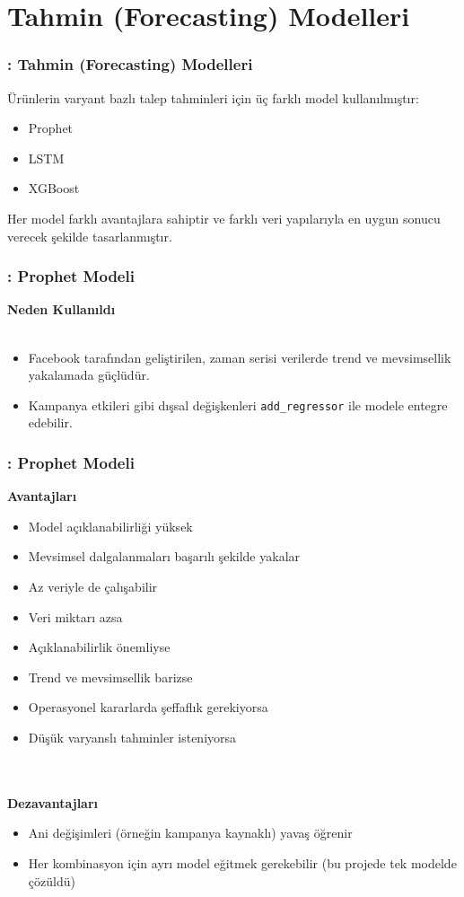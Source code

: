 \documentclass[12pt]{beamer}
\begin{document}
	\section{Tahmin (Forecasting) Modelleri}
	\begin{frame}
		\frametitle{\insertsection: Tahmin (Forecasting) Modelleri}
		Ürünlerin varyant bazlı talep tahminleri için üç farklı model
		kullanılmıştır:
		\vspace{0.5cm}
		\begin{itemize}
			\item Prophet
			\item LSTM
			\item XGBoost
		\end{itemize}
		\vspace{0.5cm}
		Her model farklı avantajlara sahiptir ve farklı veri yapılarıyla en
		uygun sonucu verecek şekilde tasarlanmıştır.
	\end{frame}
	
	\begin{frame}
		\frametitle{\insertsection: Prophet Modeli}
		\textbf{Neden Kullanıldı} \\~\\
		\begin{itemize}
			\item Facebook tarafından geliştirilen, zaman serisi verilerde
			trend ve mevsimsellik yakalamada güçlüdür.
			\item Kampanya etkileri gibi dışsal değişkenleri
			\texttt{add\_regressor} ile modele entegre edebilir.
		\end{itemize}
	\end{frame}
	
	\begin{frame}
		\frametitle{\insertsection: Prophet Modeli}
		\textbf{Avantajları}
		\begin{itemize}
			\item Model açıklanabilirliği yüksek
			\item Mevsimsel dalgalanmaları başarılı şekilde yakalar
			\item Az veriyle de çalışabilir
			\item Veri miktarı azsa
			\item Açıklanabilirlik önemliyse
			\item Trend ve mevsimsellik barizse
			\item Operasyonel kararlarda şeffaflık gerekiyorsa
			\item Düşük varyanslı tahminler isteniyorsa
		\end{itemize}
		\\~\\
		\textbf{Dezavantajları}
		\begin{itemize}
			\item Ani değişimleri (örneğin kampanya kaynaklı) yavaş öğrenir
			\item Her kombinasyon için ayrı model eğitmek gerekebilir (bu
			projede tek modelde çözüldü)
		\end{itemize}
	\end{frame}
	
\end{document}
